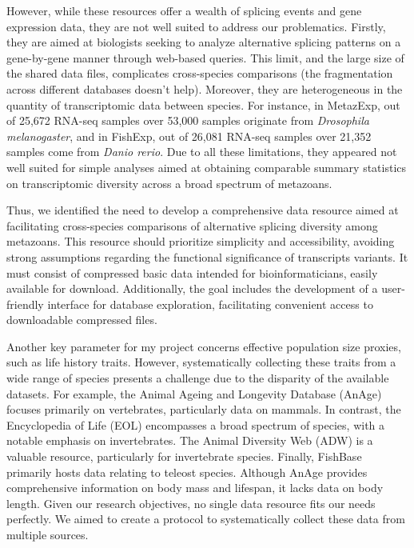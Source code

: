 However, while these resources offer a wealth of splicing events and gene expression data, they are not well suited to address our problematics. Firstly, they are aimed at biologists seeking to analyze alternative splicing patterns on a gene-by-gene manner through web-based queries. 
This limit, and the large size of the shared data files, complicates cross-species comparisons (the fragmentation across different databases doesn't help). Moreover, they are heterogeneous in the quantity of transcriptomic data between species. For instance, in MetazExp, out of 25,672 RNA-seq samples over 53,000 samples originate from \textit{Drosophila melanogaster}, and in FishExp, out of 26,081 RNA-seq samples over 21,352 samples come from \textit{Danio rerio}. Due to all these limitations, they appeared not well suited for simple analyses aimed at obtaining comparable summary statistics on transcriptomic diversity across a broad spectrum of metazoans.

Thus, we identified the need to develop a comprehensive data resource aimed at facilitating cross-species comparisons of alternative splicing diversity among metazoans. This resource should prioritize simplicity and accessibility, avoiding strong assumptions regarding the functional significance of transcripts variants. It must consist of compressed basic data intended for bioinformaticians, easily available for download. Additionally, the goal includes the development of a user-friendly interface for database exploration, facilitating convenient access to downloadable compressed files.

Another key parameter for my project concerns effective population size proxies, such as life history traits. However, systematically collecting these traits from a wide range of species presents a challenge due to the disparity of the available datasets. For example, the Animal Ageing and Longevity Database (AnAge) \citep{tacutu_human_2013} focuses primarily on vertebrates, particularly data on mammals. In contrast, the Encyclopedia of Life (EOL) \citep{wilson_encyclopedia_2003, parr_encyclopedia_2014} encompasses a broad spectrum of species, with a notable emphasis on invertebrates. The Animal Diversity Web (ADW) \citep{myers_animal_2023} is a valuable resource, particularly for invertebrate species. Finally, FishBase \citep{froese_fishbase_2023} primarily hosts data relating to teleost species. Although AnAge provides comprehensive information on body mass and lifespan, it lacks data on body length. Given our research objectives, no single data resource fits our needs perfectly. We aimed to create a protocol to systematically collect these data from multiple sources.

